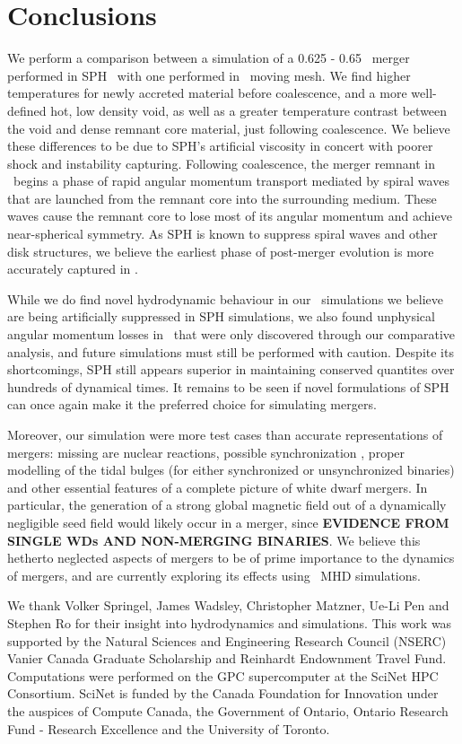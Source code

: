 \section{Conclusions}
\label{sec:conclusions}

We perform a comparison between a simulation of a 0.625 - 0.65 \Msun\ merger performed in SPH \gasoline\ with one performed in \arepo\ moving mesh.  We find higher temperatures for newly accreted material before coalescence, and a more well-defined hot, low density void, as well as a greater temperature contrast between the void and dense remnant core material, just following coalescence.  We believe these differences to be due to SPH's artificial viscosity in concert with poorer shock and instability capturing.  Following coalescence, the merger remnant in \arepo\ begins a phase of rapid angular momentum transport mediated by spiral waves that are launched from the remnant core into the surrounding medium.  These waves cause the remnant core to lose most of its angular momentum and achieve near-spherical symmetry.  As SPH is known to suppress spiral waves and other disk structures, we believe the earliest phase of post-merger evolution is more accurately captured in \arepo .

While we do find novel hydrodynamic behaviour in our \arepo\ simulations we believe are being artificially suppressed in SPH simulations, we also found unphysical angular momentum losses in \arepo\ that were only discovered through our comparative analysis, and future simulations must still be performed with caution.  Despite its shortcomings, SPH still appears superior in maintaining conserved quantites over hundreds of dynamical times.  It remains to be seen if novel formulations of SPH can once again make it the preferred choice for simulating mergers.

Moreover, our simulation were more test cases than accurate representations of mergers: missing are nuclear reactions, possible synchronization \citep{fulll12, burk+13}, proper modelling of the tidal bulges (for either synchronized or unsynchronized binaries) and other essential features of a complete picture of white dwarf mergers.  In particular, the generation of a strong global magnetic field out of a dynamically negligible seed field would likely occur in a merger, since \textbf{EVIDENCE FROM SINGLE WDs AND NON-MERGING BINARIES}.  We believe this hetherto neglected aspects of mergers to be of prime importance to the dynamics of mergers, and are currently exploring its effects using \arepo\ MHD simulations.

We thank Volker Springel, James Wadsley, Christopher Matzner, Ue-Li Pen and Stephen Ro for their insight into hydrodynamics and simulations.  This work was supported by the Natural Sciences and Engineering Research Council (NSERC) Vanier Canada Graduate Scholarship and Reinhardt Endownment Travel Fund.  Computations were performed on the GPC supercomputer at the SciNet HPC Consortium.  SciNet \citep{loke+10} is funded by the Canada Foundation for Innovation under the auspices of Compute Canada, the Government of Ontario, Ontario Research Fund - Research Excellence and the University of Toronto.

